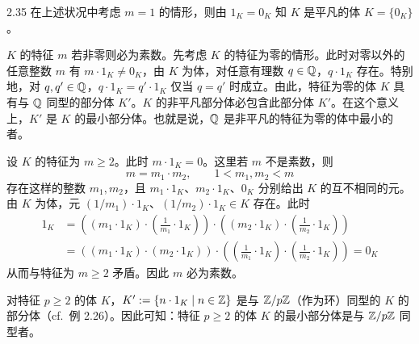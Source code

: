 \begin{remark}{2.35} 在上述状况中考虑 $m=1$ 的情形，则由 $1_K=0_K$ 知 $K$ 是平凡的体 $K=\{0_K\}$。\end{remark}



$K$ 的特征 $m$ 若非零则必为素数。先考虑 $K$ 的特征为零的情形。此时对零以外的任意整数 $m$ 有 $m\cdot1_K\neq0_K$，由 $K$ 为体，对任意有理数 $q\in\mathbb{Q}$，$q\cdot1_K$ 存在。特别地，对 $q,q'\in\mathbb{Q}$，$q\cdot1_K=q'\cdot1_K$ 仅当 $q=q'$ 时成立。由此，特征为零的体 $K$ 具有与 $\mathbb{Q}$ 同型的部分体 $K'$。$K$ 的非平凡部分体必包含此部分体 $K'$。在这个意义上，$K'$ 是 $K$ 的最小部分体。也就是说，$\mathbb{Q}$ 是非平凡的特征为零的体中最小的者。

设 $K$ 的特征为 $m\ge2$。此时 $m\cdot1_K=0$。这里若 $m$ 不是素数，则
\[
  m=m_1\cdot m_2,\qquad 1<m_1,m_2<m
\]
存在这样的整数 $m_1,m_2$，且 $m_1\cdot1_K$、$m_2\cdot1_K$、$0_K$ 分别给出 $K$ 的互不相同的元。由 $K$ 为体，元 $(1/m_1)\cdot1_K$、$(1/m_2)\cdot1_K\in K$ 存在。此时
\begin{align*}
  1_K &= \left((m_1\cdot1_K)\cdot\left(\frac{1}{m_1}\cdot1_K\right)\right)\cdot\left((m_2\cdot1_K)\cdot\left(\frac{1}{m_2}\cdot1_K\right)\right)\\
      &= \left((m_1\cdot1_K)\cdot(m_2\cdot1_K)\right)\cdot\left(\left(\frac{1}{m_1}\cdot1_K\right)\cdot\left(\frac{1}{m_2}\cdot1_K\right)\right) = 0_K
\end{align*}
从而与特征为 $m\ge2$ 矛盾。因此 $m$ 必为素数。

对特征 $p\ge2$ 的体 $K$，$K':=\{n\cdot1_K \mid n\in\mathbb{Z}\}$ 是与 $\mathbb{Z}/p\mathbb{Z}$（作为环）同型的 $K$ 的部分体（cf.\ 例 2.26）。因此可知：特征 $p\ge2$ 的体 $K$ 的最小部分体是与 $\mathbb{Z}/p\mathbb{Z}$ 同型者。


